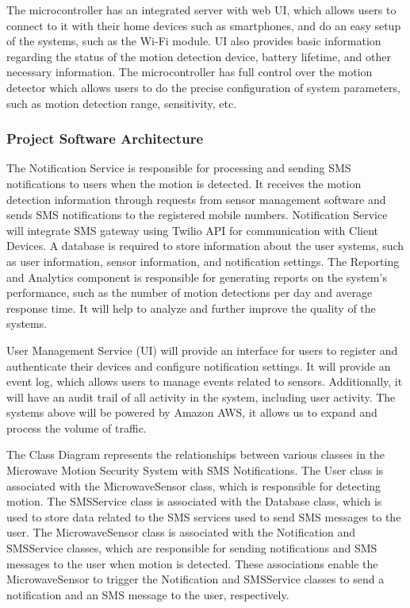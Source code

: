 The microcontroller has an integrated server with web UI, which allows users
to connect to it with their home devices such as smartphones, and do an easy setup
of the systems, such as the Wi-Fi module. %
UI also provides basic information regarding the status of the motion detection device, battery lifetime, and other necessary
information. %
The microcontroller has full control over the motion detector which allows users to do the precise configuration of system parameters, such as motion
detection range, sensitivity, etc. %


\subsubsection{Project Software Architecture}

The Notification Service is responsible for processing and sending SMS notifications
to users when the motion is detected. %
It receives the motion detection information through requests from sensor management software and sends SMS notifications to the
registered mobile numbers. %
Notification Service will integrate SMS gateway using Twilio API for communication with Client Devices.
A database is required to store information about the user systems, such as user information, sensor information,
and notification settings. %
The Reporting and Analytics component is responsible for generating reports on the system’s performance, such as the number of motion
detections per day and average response time. %
It will help to analyze and further improve the quality of the systems. %



User Management Service (UI) will provide an interface for users to register and
authenticate their devices and configure notification settings. %
It will provide an event log, which allows users to manage events related to sensors. %
Additionally, it will have an audit trail of all activity in the system, including user activity. %
The systems above will be powered by Amazon AWS, it allows us to expand and process
the volume of traffic. %



The Class Diagram represents the relationships between various classes in the
Microwave Motion Security System with SMS Notifications. %
The User class is associated with the MicrowaveSensor class, which is responsible for detecting motion. %
The SMSService class is associated with the Database class, which is used to store
data related to the SMS services used to send SMS messages to the user. %
The MicrowaveSensor class is associated with the Notification and SMSService classes,
which are responsible for sending notifications and SMS messages to the user when
motion is detected. %
These associations enable the MicrowaveSensor to trigger the Notification and SMSService classes to send a notification and an SMS message
to the user, respectively. %

